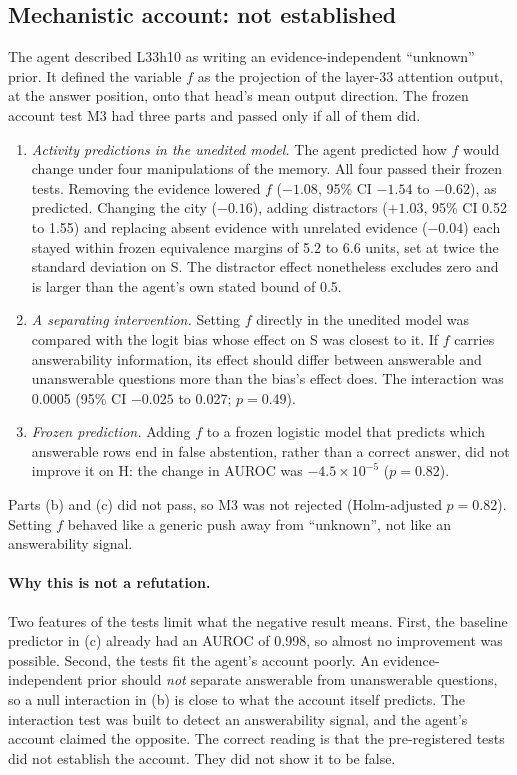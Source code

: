 \subsection{Mechanistic account: not established}

The agent described L33h10 as writing an evidence-independent ``unknown'' prior. It defined the variable $f$ as the
projection of the layer-33 attention output, at the answer position, onto that head's mean output direction. The
frozen account test M3 had three parts and passed only if all of them did.
\begin{enumerate}[leftmargin=*,label=(\alph*)]
  \item \emph{Activity predictions in the unedited model.} The agent predicted how $f$ would change under four
        manipulations of the memory. All four passed their frozen tests. Removing the evidence lowered $f$ ($-1.08$,
        95\% CI $-1.54$ to $-0.62$), as predicted. Changing the city ($-0.16$), adding distractors ($+1.03$, 95\% CI
        0.52 to 1.55) and replacing absent evidence with unrelated evidence ($-0.04$) each stayed within frozen
        equivalence margins of 5.2 to 6.6 units, set at twice the standard deviation on S. The distractor effect
        nonetheless excludes zero and is larger than the agent's own stated bound of 0.5.
  \item \emph{A separating intervention.} Setting $f$ directly in the unedited model was compared with the logit bias whose
        effect on S was closest to it. If $f$ carries answerability information, its effect should differ between
        answerable and unanswerable questions more than the bias's effect does. The interaction was 0.0005 (95\% CI
        $-0.025$ to 0.027; $p = 0.49$).
  \item \emph{Frozen prediction.} Adding $f$ to a frozen logistic model that predicts which answerable
        rows end in false abstention, rather than a correct answer, did not improve it on H: the change in AUROC was $-4.5 \times 10^{-5}$ ($p = 0.82$).
\end{enumerate}
Parts (b) and (c) did not pass, so M3 was not rejected (Holm-adjusted $p = 0.82$). Setting $f$ behaved like a generic push
away from ``unknown'', not like an answerability signal.

\paragraph{Why this is not a refutation.}
Two features of the tests limit what the negative result means. First, the baseline predictor in (c) already had an
AUROC of 0.998, so almost no improvement was possible. Second, the tests fit the agent's account poorly. An
evidence-independent prior should \emph{not} separate answerable from unanswerable questions, so a null interaction in
(b) is close to what the account itself predicts. The interaction test was built to detect an answerability signal, and
the agent's account claimed the opposite. The correct reading is that the pre-registered tests did not establish the account.
They did not show it to be false.

